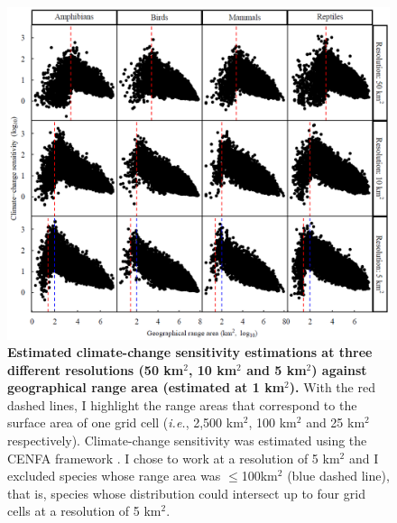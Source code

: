 \begin{figure}[h!]
\centering
\includegraphics[scale=0.6]{Supporting/Chapter4/Figures/CENFA_allres.png}
\caption[Estimated climate-change sensitivity estimations at three different resolutions]{\textbf{Estimated climate-change sensitivity estimations at three different resolutions (50 km$^2$, 10 km$^2$ and 5 km$^2$) against geographical range area (estimated at 1 km$^2$).} With the red dashed lines, I highlight the range areas that correspond to the surface area of one grid cell (\textit{i.e.}, 2,500 km$^2$, 100 km$^2$ and 25 km$^2$ respectively). Climate-change sensitivity was estimated using the CENFA framework \citep{Rinnan2019}. I chose to work at a resolution of 5 km$^2$ and I excluded species whose range area was $\leq$100km$^2$ (blue dashed line), that is, species whose distribution could intersect up to four grid cells at a resolution of 5 km$^2$.}
\label{SI_4_Figure7}
\end{figure}


